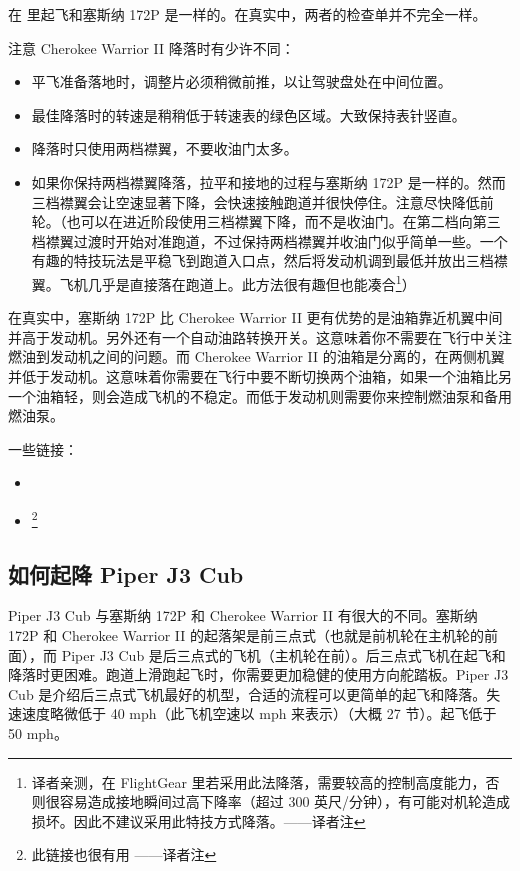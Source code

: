 \begin{itemize}
在 \FlightGear{} 里起飞和塞斯纳 172P 是一样的。在真实中，两者的检查单并不完全一样。

注意 Cherokee Warrior II 降落时有少许不同：

\begin{itemize}
    \item 平飞准备落地时，调整片必须稍微前推，以让驾驶盘处在中间位置。
    \item 最佳降落时的转速是稍稍低于转速表的绿色区域。大致保持表针竖直。
    \item 降落时只使用两档襟翼，不要收油门太多。
    \item 如果你保持两档襟翼降落，拉平和接地的过程与塞斯纳 172P 是一样的。然而三档襟翼会让空速显著下降，会快速接触跑道并很快停住。注意尽快降低前轮。（也可以在进近阶段使用三档襟翼下降，而不是收油门。在第二档向第三档襟翼过渡时开始对准跑道，不过保持两档襟翼并收油门似乎简单一些。一个有趣的特技玩法是平稳飞到跑道入口点，然后将发动机调到最低并放出三档襟翼。飞机几乎是直接落在跑道上。此方法很有趣但也能凑合\footnote{译者亲测，在 FlightGear 里若采用此法降落，需要较高的控制高度能力，否则很容易造成接地瞬间过高下降率（超过 300 英尺/分钟），有可能对机轮造成损坏。因此不建议采用此特技方式降落。——译者注}）
\end{itemize}

在真实中，塞斯纳 172P 比 Cherokee Warrior II 更有优势的是油箱靠近机翼中间并高于发动机。另外还有一个自动油路转换开关。这意味着你不需要在飞行中关注燃油到发动机之间的问题。而 Cherokee Warrior II 的油箱是分离的，在两侧机翼并低于发动机。这意味着你需要在飞行中要不断切换两个油箱，如果一个油箱比另一个油箱轻，则会造成飞机的不稳定。而低于发动机则需要你来控制燃油泵和备用燃油泵。

一些链接：
\begin{itemize}
    \item {}
    \item {} \footnote{此链接也很有用  ——译者注}
\end{itemize}

\subsection{如何起降 Piper J3 Cub}
    \label{sec:PiperJ3}

Piper J3 Cub 与塞斯纳 172P 和 Cherokee Warrior II 有很大的不同。塞斯纳 172P 和 Cherokee Warrior II 的起落架是前三点式（也就是前机轮在主机轮的前面），而 Piper J3 Cub 是后三点式的飞机（主机轮在前）。后三点式飞机在起飞和降落时更困难。跑道上滑跑起飞时，你需要更加稳健的使用方向舵踏板。Piper J3 Cub 是介绍后三点式飞机最好的机型，合适的流程可以更简单的起飞和降落。失速速度略微低于 40 mph（此飞机空速以 mph 来表示）（大概 27 节）。起飞低于 50 mph。


\end{itemize}
